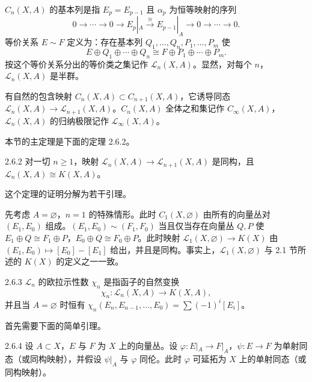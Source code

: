 $C_n(X,A)$ 的基本列是指 $E_p=E_{p-1}$ 且 $\alpha_p$ 为恒等映射的序列
\[
0\longrightarrow\cdots\longrightarrow 0\longrightarrow E_p|_A\xrightarrow{\ \cong\ }E_{p-1}|_A\longrightarrow 0\longrightarrow\cdots\longrightarrow 0.
\]
等价关系 $E\sim F$ 定义为：存在基本列 $Q_1,\dots,Q_n,P_1,\dots,P_m$ 使
\[
E\oplus Q_1\oplus\cdots\oplus Q_n\cong F\oplus P_1\oplus\cdots\oplus P_m.
\]
按这个等价关系分出的等价类之集记作 $\mathcal{L}_n(X,A)$。显然，对每个 $n$，$\mathcal{L}_n(X,A)$ 是半群。

有自然的包含映射 $C_n(X,A)\subset C_{n+1}(X,A)$，它诱导同态 $\mathcal{L}_n(X,A)\to\mathcal{L}_{n+1}(X,A)$。$C_n(X,A)$ 全体之和集记作 $C_\infty(X,A)$，$\mathcal{L}_n(X,A)$ 的归纳极限记作 $\mathcal{L}_\infty(X,A)$。

本节的主定理是下面的定理 2.6.2。

\begin{theorem*}{2.6.2}
  对一切 $n\ge 1$，映射 $\mathcal{L}_n(X,A)\to\mathcal{L}_{n+1}(X,A)$ 是同构，且 $\mathcal{L}_n(X,A)\cong K(X,A)$。
\end{theorem*}

这个定理的证明分解为若干引理。

先考虑 $A=\varnothing$，$n=1$ 的特殊情形。此时 $C_1(X,\varnothing)$ 由所有的向量丛对 $(E_1,E_0)$ 组成。$(E_1,E_0)\sim(F_1,F_0)$ 当且仅当存在向量丛 $Q,P$ 使 $E_1\oplus Q\cong F_1\oplus P$，$E_0\oplus Q\cong F_0\oplus P$。此时映射 $\mathcal{L}_1(X,\varnothing)\to K(X)$ 由 $(E_1,E_0)\mapsto[E_0]-[E_1]$ 给出，并且是同构。事实上，$\mathcal{L}_1(X,\varnothing)$ 与 2.1 节所述的 $K(X)$ 的定义之一一致。

\begin{definition}{2.6.3}
  $\mathcal{L}_n$ 的欧拉示性数 $\chi_n$ 是指函子的自然变换
  \[
  \chi_n\colon\mathcal{L}_n(X,A)\longrightarrow K(X,A),
  \]
  并且当 $A=\varnothing$ 时恒有 $\chi_n(E_n,E_{n-1},\dots,E_0)=\sum(-1)^i[E_i]$。
\end{definition}

首先需要下面的简单引理。

\begin{lemma*}{2.6.4}
  设 $A\subset X$，$E$ 与 $F$ 为 $X$ 上的向量丛。设 $\varphi\colon E|_A\to F|_A$，$\psi\colon E\to F$ 为单射同态（或同构映射），并假设 $\psi|_A$ 与 $\varphi$ 同伦。此时 $\varphi$ 可延拓为 $X$ 上的单射同态（或同构映射）。
\end{lemma*}

